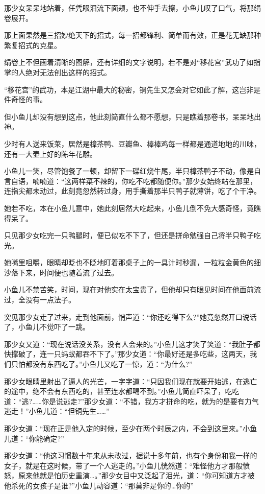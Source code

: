 \documentclass[12pt,oneside]{book}
\begin{document}
那少女呆呆地站着，任凭眼泪流下面颊，也不伸手去擦，小鱼儿叹了口气，将那绢卷展开。

那上面果然是三招妙绝天下的招式，每一招都锋利、简单而有效，正是花无缺那种繁复招式的克星。

绢卷上不但画着清晰的图解，还有详细的文字说明，若不是对``移花宫''武功了如指掌的人绝对无法创出这样的招式。

``移花宫''的武功，本是江湖中最大的秘密，铜先生又怎会对它如此了解，这岂非是件奇怪的事。

但小鱼儿却没有想到这点，他此刻简直什么都不愿想，只是瞧着那卷书，呆呆地出神。

少时有人送来饭莱，居然是樟茶鸭、豆瓣鱼、棒棒鸡每一样都是通道地地的川味，还有一大壶上好的陈年花雕。

小鱼儿一笑，尽管饱餐了一顿，却留下一碟红烧牛尾，半只樟茶鸭子不动，像是自言自语，喃喃道：``这两样菜不辣的，你吃不吃都随便你。''那少女始终站在那里，连指尖都未动过，此刻竟忽然转过身，用手撕着那半只鸭子就薄饼，吃了个干净。

她若不吃，本在小鱼儿意中，她此刻居然大吃起来，小鱼儿倒不免大感奇怪，竟瞧得呆了。

只见那少女吃完一只鸭腿时，便已似吃不下了，但还是拼命勉强自己将半只鸭子吃光。

她嘴里咀嚼，眼睛却眨也不眨地盯着那桌子上的一具计时秒漏，一粒粒金黄色的细沙落下来，时间便也随着流了过去。

小鱼儿不禁苦笑，时间，现在对他实在太宝贵了，但他却只有眼见时间在他面前流过，全没有一点法子。

突见那少女走了过来，走到他面前，悄声道：``你还吃得下么?''她竟忽然开口说话了，小鱼儿不觉吓了一跳。

那少女又道：``现在说话没关系，没有人会来的。''小鱼儿这才笑了笑道：``我肚子都快撑破了，连一只蚂蚁都吞不下了。''那少女道：``你最好还是多吃些，这两天，我们只怕都没有东西吃了。''小鱼儿又吃了一惊，道：``为什么?''

那少女眼睛里射出了逼人的光芒，一字字道：``只因我们现在就要开始逃，在逃亡的途中，绝不会有东西吃的，甚至连水都喝不到。''小鱼儿简直吓呆了，吃吃道：``逃?\ldots\ldots 你是说逃走?''那少女道：``不错，我方才拼命的吃，就为的是要有力气逃走！''小鱼儿道：``但铜先生\ldots\ldots{}''

那少女道：``现在正是他入定的时候，至少在两个时辰之内，不会到这里来。''小鱼儿道：``你能确定?''

那少女道：``他这习惯数十年来从未改过，据说十多年前，也有个身份和我一样的女子，就是在这时候，带了一个人逃走的。''小鱼儿恍然道：``难怪他方才那般愤怒，原来他就是怕历史重演\ldots。''那少女目中又泛起了泪光，道：``你可知道方才被他杀死的女孩子是谁?''小鱼儿动容道：``那莫非是你的\ldots 你的''
\end{document}
